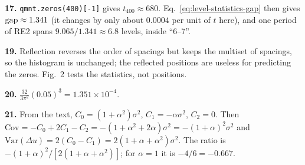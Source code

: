 \textbf{17.} \texttt{qmnt.zeros(400)[-1]} gives $t_{400}\approx680$. Eq.~\eqref{eq:level-statistics-gap} then gives $\mathrm{gap}\approx1.341$ (it changes by only about $0.0004$ per unit of $t$ here), and one period of RE2 spans $9.065/1.341\approx6.8$ levels, inside ``6--7''.

\textbf{19.} Reflection reverses the order of spacings but keeps the multiset of spacings, so the histogram is unchanged; the reflected positions are useless for predicting the zeros. Fig.~2 tests the statistics, not positions.

\textbf{20.} $\frac{32}{3\pi^2}(0.05)^3=1.351\times10^{-4}$.

\textbf{21.} From the text, $C_0=(1+\alpha^2)\sigma^2$, $C_1=-\alpha\sigma^2$, $C_2=0$. Then $\mathrm{Cov}=-C_0+2C_1-C_2=-(1+\alpha^2+2\alpha)\sigma^2=-(1+\alpha)^2\sigma^2$ and $\mathrm{Var}(\Delta u)=2(C_0-C_1)=2(1+\alpha+\alpha^2)\sigma^2$. The ratio is $-(1+\alpha)^2/[2(1+\alpha+\alpha^2)]$; for $\alpha=1$ it is $-4/6=-0.667$.
